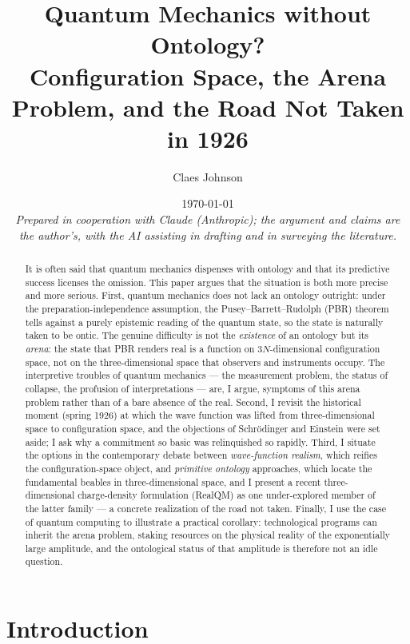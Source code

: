 \documentclass[11pt]{article}
\title{Quantum Mechanics without Ontology?\\
\large Configuration Space, the Arena Problem, and the Road Not Taken in 1926}
\author[1]{Claes Johnson}
\affil[1]{KTH Royal Institute of Technology, SE-100 44 Stockholm, Sweden \\
\texttt{claesjohnson@gmail.com}}
\date{\today \\[0.4em]
\small\textit{Prepared in cooperation with Claude (Anthropic); the argument and claims are the author's, with the
AI assisting in drafting and in surveying the literature.}}
\begin{document}
\maketitle

\begin{abstract}
It is often said that quantum mechanics dispenses with ontology and that its predictive success licenses the
omission. This paper argues that the situation is both more precise and more serious. First, quantum mechanics
does not lack an ontology outright: under the preparation-independence assumption, the Pusey--Barrett--Rudolph
(PBR) theorem tells against a purely epistemic reading of the quantum state, so the state is naturally taken to
be ontic. The genuine difficulty is not the \emph{existence} of an ontology but its \emph{arena}: the state that
PBR renders real is a function on $3N$-dimensional configuration space, not on the three-dimensional space that
observers and instruments occupy. The interpretive troubles of quantum mechanics --- the measurement problem,
the status of collapse, the profusion of interpretations --- are, I argue, symptoms of this arena problem rather
than of a bare absence of the real. Second, I revisit the historical moment (spring 1926) at which the wave
function was lifted from three-dimensional space to configuration space, and the objections of Schr\"odinger and
Einstein were set aside; I ask why a commitment so basic was relinquished so rapidly. Third, I situate the
options in the contemporary debate between \emph{wave-function realism}, which reifies the configuration-space
object, and \emph{primitive ontology} approaches, which locate the fundamental beables in three-dimensional
space, and I present a recent three-dimensional charge-density formulation (RealQM) as one under-explored member
of the latter family --- a concrete realization of the road not taken. Finally, I use the case of quantum
computing to illustrate a practical corollary: technological programs can inherit the arena problem, staking
resources on the physical reality of the exponentially large amplitude, and the ontological status of that
amplitude is therefore not an idle question.
\end{abstract}


\section{Introduction}\label{sec:intro}
\end{document}
